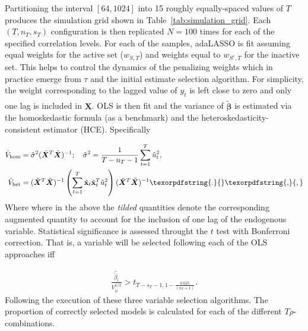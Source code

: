 \documentclass[10pt,a4paper,oneside]{article}
\providecommand{\DIFaddtex}[1]{{\protect\color{blue} \sf #1}} %
\providecommand{\DIFdeltex}[1]{{\protect\color{red} \scriptsize #1}} %
\providecommand{\DIFaddbegin}{} %
\providecommand{\DIFaddend}{} %
\providecommand{\DIFdelbegin}{} %
\providecommand{\DIFdelend}{} %
\providecommand{\DIFadd}[1]{\texorpdfstring{\DIFaddtex{#1}}{#1}} %
\providecommand{\DIFdel}[1]{\texorpdfstring{\DIFdeltex{#1}}{}} %
\newcommand{\DIFscaledelfig}{0.5}
\newlength{\DIFdelgraphicswidth} %
\newlength{\DIFdelgraphicsheight} %
\newcommand{\DIFaddincludegraphics}[2][]{{\color{blue}\fbox{\DIFOincludegraphics[#1]{#2}}}} %
\newcommand{\DIFdelincludegraphics}[2][]{%
\sbox{\DIFdelgraphicsbox}{\DIFOincludegraphics[#1]{#2}}%
\settoboxwidth{\DIFdelgraphicswidth}{\DIFdelgraphicsbox} %
\settoboxtotalheight{\DIFdelgraphicsheight}{\DIFdelgraphicsbox} %
\scalebox{\DIFscaledelfig}{%
\parbox[b]{\DIFdelgraphicswidth}{\usebox{\DIFdelgraphicsbox}\\[-\baselineskip] \rule{\DIFdelgraphicswidth}{0em}}\llap{\resizebox{\DIFdelgraphicswidth}{\DIFdelgraphicsheight}{%
\setlength{\unitlength}{\DIFdelgraphicswidth}%
\begin{picture}(1,1)%
\thicklines\linethickness{2pt} %
{\color[rgb]{1,0,0}\put(0,0){\framebox(1,1){}}}%
{\color[rgb]{1,0,0}\put(0,0){\line( 1,1){1}}}%
{\color[rgb]{1,0,0}\put(0,1){\line(1,-1){1}}}%
\end{picture}%
}\hspace*{3pt}}} %
} %
\DeclareRobustCommand{\DIFaddbegin}{\DIFOaddbegin \let\includegraphics\DIFaddincludegraphics} %
\DeclareRobustCommand{\DIFaddend}{\DIFOaddend \let\includegraphics\DIFOincludegraphics} %
\DeclareRobustCommand{\DIFdelbegin}{\DIFOdelbegin \let\includegraphics\DIFdelincludegraphics} %
\DeclareRobustCommand{\DIFdelend}{\DIFOaddend \let\includegraphics\DIFOincludegraphics} %
\begin{document}
Partitioning the interval $[64,1024]$ into 15 roughly equally‐spaced values of $T$ produces the simulation grid shown in Table~\ref{tab:simulation_grid}.  Each $(T,n_T,s_T)$ configuration is then replicated $N=100$ times for each of the specified correlation levels. For each of the samples, adaLASSO is fit assuming equal weights for the active set ($w_{S,T}$) and weights equal to $w_{S^c, T}$ for the inactive set. This helps to control the dynamics of the penalizing weights which in practice emerge from $\tau$ and the initial estimate selection algorithm. For simplicity, the weight corresponding to the lagged value of $y_t$ is left close to zero and only one lag is included in $\mathbf{X}$. OLS is then fit and the variance of $\hat{\tilde{\boldsymbol{\beta}}}$ is estimated via the homoskedastic formula (as a benchmark) and the heteroskedasticity-consistent estimator (HCE). Specifically

\begin{align*}
    \hat{V}_{\mathrm{hom}} &= \hat{\sigma}^2(\tilde{\boldsymbol{X}}^T \tilde{\boldsymbol{X}})^{-1}; \quad  \hat{\sigma}^2 = \frac{1}{T - n_T - 1}\sum^{T}_{t = 1} \hat{u}_t^2,\\
    \hat{V}_{\mathrm{het}} &= (\tilde{\boldsymbol{X}}^T \tilde{\boldsymbol{X}})^{-1} \left( \sum^T_{t = 1} \tilde{\mathbf{x}}_t \tilde{\mathbf{x}}^T_t \hat{u}^2_t \right) (\tilde{\boldsymbol{X}}^T \tilde{\boldsymbol{X}})^{-1}\DIFdelbegin \DIFdel{.
}\DIFdelend \DIFaddbegin \DIFadd{,
}\DIFaddend \end{align*}
\DIFdelbegin \DIFdel{Where }\DIFdelend \DIFaddbegin \DIFadd{where }\DIFaddend in the above the \textit{tilded} quantities denote the corresponding augmented quantity to account for the inclusion of one lag of the endogenous variable. Statistical significance is assessed throught the $t$ test with Bonferroni correction. That is, a variable will be selected following each of the OLS approaches iff

\begin{align*}
    \frac{\hat{\tilde{\beta}}_i}{V_{ii}^{1 / 2}} > t_{T - s_T - 1, 1 - \frac{0.025}{(n_T + 1)}}.
\end{align*}
Following the execution of these three variable selection algorithms. The proportion of correctly selected models is calculated for each of the different $T \rho$-combinations.
\end{document}
